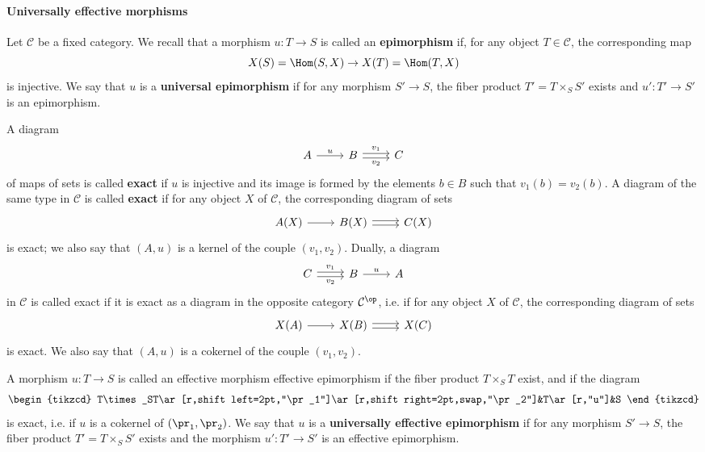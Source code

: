 \paragraph{Universally effective morphisms}
Let $\mathcal{C}$ be a fixed category. We recall that a morphism $u:T\to S$ is called an \textbf{epimorphism} if, for any object $T\in\mathcal{C}$, the corresponding map
\[X(S)=\Hom(S,X)\to X(T)=\Hom(T,X)\]
is injective. We say that $u$ is a \textbf{universal epimorphism} if for any morphism $S'\to S$, the fiber product $T'=T\times_SS'$ exists and $u':T'\to S'$ is an epimorphism.
\begin{definition}
A diagram
\[\begin{tikzcd}
A\ar[r,"u"]&B\ar[r,shift left=2pt,"v_1"]\ar[r,shift right=2pt,swap,"v_2"]&C
\end{tikzcd}\]
of maps of sets is called \textbf{exact} if $u$ is injective and its image is formed by the elements $b\in B$ such that $v_1(b)=v_2(b)$. A diagram of the same type in $\mathcal{C}$ is called \textbf{exact} if for any object $X$ of $\mathcal{C}$, the corresponding diagram of sets
\[\begin{tikzcd}
A(X)\ar[r]&B(X)\ar[r,shift left=2pt]\ar[r,shift right=2pt]&C(X)
\end{tikzcd}\]
is exact; we also say that $(A,u)$ is a kernel of the couple $(v_1,v_2)$. Dually, a diagram
\[\begin{tikzcd}
C\ar[r,shift left=2pt,"v_1"]\ar[r,shift right=2pt,swap,"v_2"]&B\ar[r,"u"]&A
\end{tikzcd}\]
in $\mathcal{C}$ is called exact if it is exact as a diagram in the opposite category $\mathcal{C}^{\op}$, i.e. if for any object $X$ of $\mathcal{C}$, the corresponding diagram of sets
\[\begin{tikzcd}
X(A)\ar[r]&X(B)\ar[r,shift left=2pt]\ar[r,shift right=2pt]&X(C)
\end{tikzcd}\]
is exact. We also say that $(A,u)$ is a cokernel of the couple $(v_1,v_2)$.
\end{definition}
\begin{definition}
A morphism $u:T\to S$ is called an effective morphism effective epimorphism if the fiber product $T\times_ST$ exist, and if the diagram
\[\begin{tikzcd}
T\times_ST\ar[r,shift left=2pt,"\pr_1"]\ar[r,shift right=2pt,swap,"\pr_2"]&T\ar[r,"u"]&S
\end{tikzcd}\]
is exact, i.e. if $u$ is a cokernel of $(\pr_1,\pr_2)$. We say that $u$ is a \textbf{universally effective epimorphism} if for any morphism $S'\to S$, the fiber product $T'=T\times_SS'$ exists and the morphism $u':T'\to S'$ is an effective epimorphism.
\end{definition}
